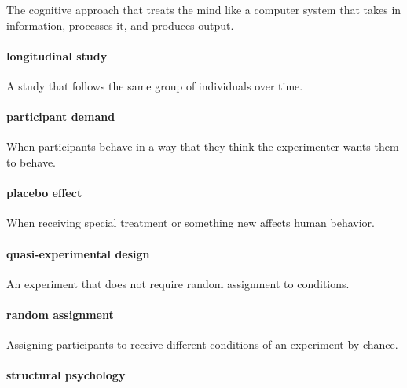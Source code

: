 \documentclass[
]{krantz}
\begin{document}
The cognitive approach that treats the mind like a computer system that takes in information, processes it, and produces output.

\paragraph*{longitudinal study}\label{longitudinal-study}

A study that follows the same group of individuals over time.

\paragraph*{participant demand}\label{participant-demand}

When participants behave in a way that they think the experimenter wants them to behave.

\paragraph*{placebo effect}\label{placebo-effect}

When receiving special treatment or something new affects human behavior.

\paragraph*{quasi-experimental design}\label{quasi-experimental-design}

An experiment that does not require random assignment to conditions.

\paragraph*{random assignment}\label{random-assignment}

Assigning participants to receive different conditions of an experiment by chance.

\paragraph*{structural psychology}\label{structural-psychology}
\end{document}
